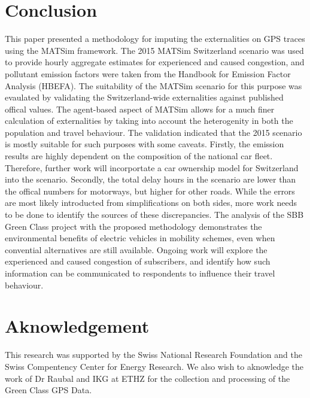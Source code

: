 \section{Conclusion}
This paper presented a methodology for imputing the externalities on GPS traces using the MATSim framework. 
The 2015 MATSim Switzerland scenario was used to provide hourly aggregate estimates for experienced and caused congestion, and pollutant emission factors were taken from the Handbook for Emission Factor Analysis (HBEFA). 
The suitability of the MATSim scenario for this purpose was evaulated by validating the Switzerland-wide externalities against published offical values. 
The agent-based aspect of MATSim allows for a much finer calculation of externalities by taking into account the heterogenity in both the population and travel behaviour. 
The validation indicated that the 2015 scenario is mostly suitable for such purposes with some caveats. 
Firstly, the emission results are highly dependent on the composition of the national car fleet. 
Therefore, further work will incorportate a car ownership model for Switzerland into the scenario.
Secondly, the total delay hours in the scenario are lower than the offical numbers for motorways, but higher for other roads. 
While the errors are most likely introducted from simplifications on both sides, more work needs to be done to identify the sources of these discrepancies.
The analysis of the SBB Green Class project with the proposed methodology demonstrates the environmental benefits of electric vehicles in mobility schemes, even when convential alternatives are still available.
Ongoing work will explore the experienced and caused congestion of subscribers, and identify how such information can be communicated to respondents to influence their travel behaviour. 

\section{Aknowledgement}
This research was supported by the Swiss National Research Foundation and the Swiss Compentency Center for Energy Research. We also wish to aknowledge the work of Dr Raubal and IKG at ETHZ for the collection and processing of the Green Class GPS Data.

